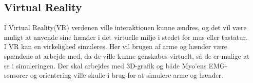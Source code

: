 \subsection{Virtual Reality}
I Virtual Reality(VR) verdenen ville interaktionen kunne ændres, og det vil være muligt at anvende sine hænder i det virtuelle miljø i stedet for mus eller tastatur. I VR kan en virkelighed simuleres. Her vil brugen af arme og hænder være spændene at arbejde med, da de ville kunne genskabes virtuelt, så de er mulige at se i simuleringen. Der skal arbejdes med 3D-grafik og både Myo'ens EMG-sensorer og orientering ville skulle i brug for at simulere arme og hænder.














